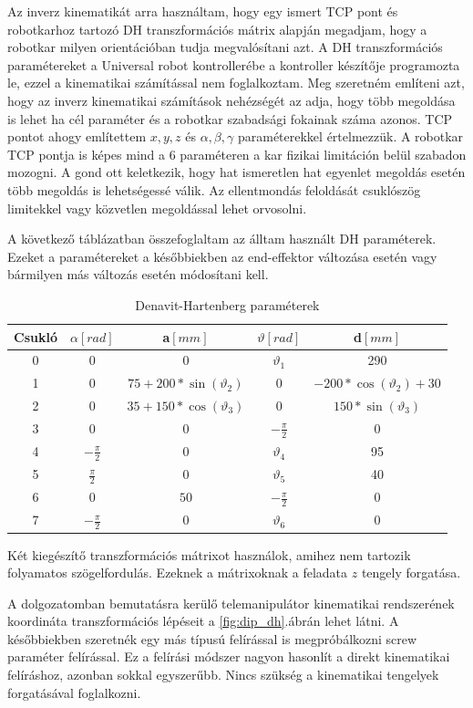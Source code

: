 Az inverz kinematikát arra használtam, hogy egy ismert TCP pont és robotkarhoz tartozó DH transzformációs mátrix alapján megadjam, hogy a robotkar milyen orientációban tudja megvalósítani azt. A DH transzformációs paramétereket a Universal robot kontrollerébe a kontroller készítője programozta le, ezzel a kinematikai számítással nem foglalkoztam. Meg szeretném említeni azt, hogy az inverz kinematikai számítások nehézségét az adja, hogy több megoldása is lehet ha cél paraméter és a robotkar szabadsági fokainak száma azonos. TCP pontot ahogy említettem $x,y,z$ és $\alpha,\beta,\gamma$ paraméterekkel értelmezzük. A robotkar TCP pontja is képes mind a 6 paraméteren a kar fizikai limitáción belül szabadon mozogni. A gond ott keletkezik, hogy hat ismeretlen hat egyenlet megoldás esetén több megoldás is lehetségessé válik. Az ellentmondás feloldását csuklószög  limitekkel vagy közvetlen megoldással lehet orvosolni. \cite{merat1987introduction}\cite{merat1987introduction}

A következő táblázatban összefoglaltam az álltam használt DH paraméterek. Ezeket a paramétereket a későbbiekben az end-effektor változása esetén vagy bármilyen más változás esetén módosítani kell.\cite{merat1987introduction}

\begin{table}[!ht]
\centering
\caption{Denavit-Hartenberg paraméterek}
\begin{tabular}{|c|c|c|c|c|}
\hline
Csukló & $\alpha [rad]$ & a$[mm]$ & $\vartheta [rad]$  & d$[mm]$ \\ 
\hline
0  & 0  & 0 & $\vartheta_{1}$ & 290 \\ 
\hline
1  & 0  & $75+200*\sin(\vartheta_{2})$  & 0 & $-200*\cos(\vartheta_{2})+30$ \\ 
\hline
2  & 0  & $35+150*\cos(\vartheta_{3})$  & 0 & $150*\sin(\vartheta_{3})$ \\ 
\hline
3  & 0  & 0 & $-\frac{\pi}{2}$ & 0 \\ 
\hline
4  & $-\frac{\pi}{2}$  & 0 & $\vartheta_{4}$ & 95 \\ 
\hline
5  & $\frac{\pi}{2}$  & 0  & $\vartheta_{5}$ & 40 \\ 
\hline
6  & 0  & $50$ & $-\frac{\pi}{2}$ & 0 \\ 
\hline
7  & $-\frac{\pi}{2}$  & 0 & $\vartheta_{6}$ & 0  \\ 
\hline
\end{tabular}
\label{tab:DH_parameterek}
\end{table}

Két kiegészítő transzformációs mátrixot használok, amihez nem tartozik folyamatos szögelfordulás. Ezeknek a mátrixoknak a feladata $z$ tengely forgatása.\cite{merat1987introduction}

A dolgozatomban bemutatásra kerülő telemanipulátor kinematikai rendszerének koordináta transzformációs lépéseit a \ref{fig:dip_dh}.ábrán lehet látni. A későbbiekben szeretnék egy más típusú felírással is megpróbálkozni screw paraméter felírással. Ez a felírási módszer nagyon hasonlít a direkt kinematikai felíráshoz, azonban sokkal egyszerűbb. Nincs szükség a kinematikai tengelyek forgatásával foglalkozni.